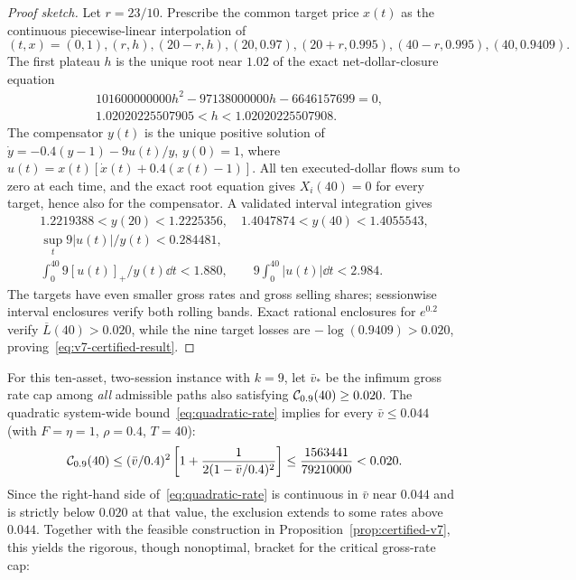 \documentclass[review,hidelinks,onefignum,onetabnum]{siamonline250211}
\begin{document}
\begin{proof}[Proof sketch]
Let $r=23/10$. Prescribe the common target price $x(t)$ as the continuous piecewise-linear interpolation of
\begin{equation}\label{eq:v7-knots}
(t,x)=(0,1),(r,h),(20-r,h),(20,0.97),(20+r,0.995),(40-r,0.995),(40,0.9409).
\end{equation}
The first plateau $h$ is the unique root near $1.02$ of the exact net-dollar-closure equation
\begin{equation}\label{eq:v7-root}
\begin{aligned}
&101600000000h^2-97138000000h-6646157699=0,\\
&1.02020225507905<h<1.02020225507908.
\end{aligned}
\end{equation}
The compensator $y(t)$ is the unique positive solution of
$\dot y=-0.4(y-1)-9u(t)/y$, $y(0)=1$, where
$u(t)=x(t)[\dot x(t)+0.4(x(t)-1)]$.
All ten executed-dollar flows sum to zero at each time, and the exact root equation gives $X_i(40)=0$ for every target, hence also for the compensator. A validated interval integration gives
\begin{equation}\label{eq:v7-bounds}
\begin{gathered}
1.2219388<y(20)<1.2225356,\quad
1.4047874<y(40)<1.4055543,\\
\sup_t9|u(t)|/y(t)<0.284481,\\
\int_0^{40}9[u(t)]_+/y(t)\dd t<1.880,\qquad
9\int_0^{40}|u(t)|\dd t<2.984.
\end{gathered}
\end{equation}
The targets have even smaller gross rates and gross selling shares; sessionwise interval enclosures verify both rolling bands. Exact rational enclosures for $e^{0.2}$ verify $\overline L(40)>0.020$, while the nine target losses are $-\log(0.9409)>0.020$, proving~\eqref{eq:v7-certified-result}.
\end{proof}
For this ten-asset, two-session instance with $k=9$, let $\bar v_*$ be the infimum gross rate cap among \emph{all} admissible paths also satisfying $\mathcal{C}_{0.9}(40)\ge0.020$. The quadratic system-wide bound~\eqref{eq:quadratic-rate} implies for every $\bar v\le 0.044$ (with $F=\eta=1$, $\rho=0.4$, $T=40$):
\[
\mathcal{C}_{0.9}(40)\le (\bar v/0.4)^2
\left[1+\frac{1}{2(1-\bar v/0.4)^2}\right]
\le \frac{1563441}{79210000}<0.020.
\]
Since the right-hand side of~\eqref{eq:quadratic-rate} is continuous in $\bar v$ near $0.044$ and is strictly below $0.020$ at that value, the exclusion extends to some rates above $0.044$. Together with the feasible construction in Proposition~\ref{prop:certified-v7}, this yields the rigorous, though nonoptimal, bracket for the critical gross-rate cap:
\end{document}
